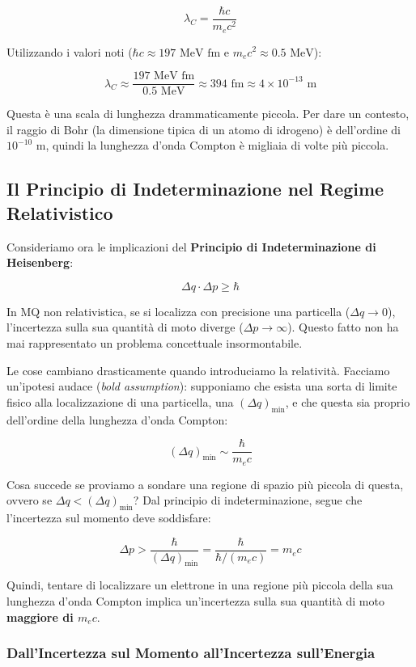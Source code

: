$$
\lambda_C = \frac{\hbar c}{m_e c^2}
$$

Utilizzando i valori noti ($\hbar c \approx 197 \text{ MeV fm}$ e $m_e c^2 \approx 0.5 \text{ MeV}$):

$$
\lambda_C \approx \frac{197 \text{ MeV fm}}{0.5 \text{ MeV}} \approx 394 \text{ fm} \approx 4 \times 10^{-13} \text{ m}
$$

Questa è una scala di lunghezza drammaticamente piccola. Per dare un contesto, il raggio di Bohr (la dimensione tipica di un atomo di idrogeno) è dell'ordine di $10^{-10}$ m, quindi la lunghezza d'onda Compton è migliaia di volte più piccola.

\subsection{Il Principio di Indeterminazione nel Regime Relativistico}

Consideriamo ora le implicazioni del \textbf{Principio di Indeterminazione di Heisenberg}:

$$
\Delta q \cdot \Delta p \ge \hbar 
$$

In MQ non relativistica, se si localizza con precisione una particella ($\Delta q \to 0$), l'incertezza sulla sua quantità di moto diverge ($\Delta p \to \infty$). Questo fatto non ha mai rappresentato un problema concettuale insormontabile.

Le cose cambiano drasticamente quando introduciamo la relatività. Facciamo un'ipotesi audace (\textit{bold assumption}): supponiamo che esista una sorta di limite fisico alla localizzazione di una particella, una $(\Delta q)_{\min}$, e che questa sia proprio dell'ordine della lunghezza d'onda Compton:

$$
(\Delta q)_{\min} \sim \frac{\hbar}{m_e c}
$$

Cosa succede se proviamo a sondare una regione di spazio più piccola di questa, ovvero se $\Delta q < (\Delta q)_{\min}$? Dal principio di indeterminazione, segue che l'incertezza sul momento deve soddisfare:

$$
\Delta p > \frac{\hbar}{(\Delta q)_{\min}} = \frac{\hbar}{\hbar / (m_e c)} = m_e c
$$

Quindi, tentare di localizzare un elettrone in una regione più piccola della sua lunghezza d'onda Compton implica un'incertezza sulla sua quantità di moto \textbf{maggiore di $m_e c$}.

\subsubsection{Dall'Incertezza sul Momento all'Incertezza sull'Energia}

